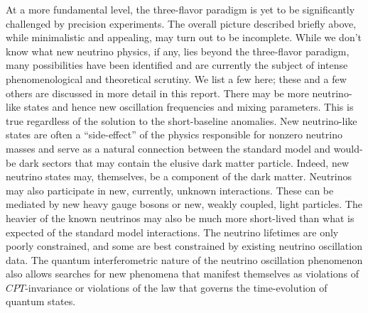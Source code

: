 At a more fundamental level, the three-flavor paradigm is yet to be significantly challenged by precision experiments. The overall picture described briefly above, while minimalistic and appealing, may turn out to be incomplete. While we don't know what new neutrino physics, if any, lies beyond the three-flavor paradigm, many possibilities have been identified and are currently the subject of intense phenomenological and theoretical scrutiny. We list a few here; these and a few others are discussed in more detail in this report. There may be more neutrino-like states and hence new oscillation frequencies and mixing parameters. This is true regardless of the solution to the short-baseline anomalies. New neutrino-like states are often a ``side-effect'' of the physics responsible for nonzero neutrino masses and serve as a natural connection between the standard model and would-be dark sectors that may contain the elusive dark matter particle. Indeed, new neutrino states may, themselves, be a component of the dark matter. Neutrinos may also participate in new, currently, unknown interactions. These can be mediated by new heavy gauge bosons or new, weakly coupled, light particles. The heavier of the known neutrinos may also be much more short-lived than what is expected of the standard model interactions. The neutrino lifetimes are only poorly constrained, and some are best constrained by existing neutrino oscillation data. The quantum interferometric nature of the neutrino oscillation phenomenon also allows searches for new phenomena that manifest themselves as violations of $CPT$-invariance or violations of the law that governs the time-evolution of quantum states. 

